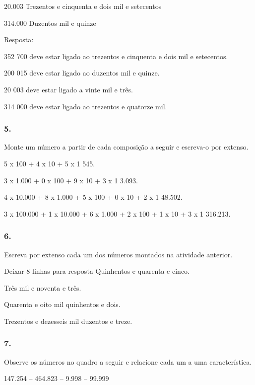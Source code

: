 \begin{enumerate}
20.003 Trezentos e cinquenta e dois mil e setecentos

314.000 Duzentos mil e quinze

Resposta:

352 700 deve estar ligado ao trezentos e cinquenta e dois mil e
setecentos.

200 015 deve estar ligado ao duzentos mil e quinze.

20 003 deve estar ligado a vinte mil e três.

314 000 deve estar ligado ao trezentos e quatorze mil.

\subsubsection{5.}\label{section-4}

Monte um número a partir de cada composição a seguir e escreva-o por extenso.

\begin{escolha}
\def\labelenumi{\alph{enumi})}
\item 5 x 100 + 4 x 10 + 5 x 1
545.
\item 3 x 1.000 + 0 x 100 + 9 x 10 + 3 x 1
3.093.
\item 4 x 10.000 + 8 x 1.000 + 5 x 100 + 0 x 10 + 2 x 1
48.502.
\item 3 x 100.000 + 1 x 10.000 + 6 x 1.000 + 2 x 100 + 1 x 10 + 3 x 1
316.213.
\end{escolha}

\subsubsection{6.}\label{section-5}

Escreva por extenso cada um dos números montados na atividade anterior.

Deixar 8 linhas para resposta
Quinhentos e quarenta e cinco.

Três mil e noventa e três.

Quarenta e oito mil quinhentos e dois.

Trezentos e dezesseis mil duzentos e treze.

\subsubsection{7.}\label{section-6}

Observe os números no quadro a seguir e relacione cada um a uma característica.

147.254 -- 464.823 -- 9.998 -- 99.999


\end{enumerate}
